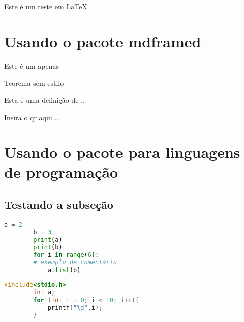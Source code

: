 \documentclass[11pt,a4paper]{article}
\begin{document}
	Este é um teste em \LaTeX

\section{Usando o pacote mdframed}
	\begin{mdframed}[style=exemplos]
		Este é um apenas 
	\end{mdframed}

\begin{mdframed}[style=teoremas]
	Teorema sem estilo
\end{mdframed}

\begin{mdframed}[style=definicao]
	Esta é uma definição de .. 	
\end{mdframed}

\begin{mdframed}[style=qrcodes]
	Insira o qr aqui .. 
\end{mdframed}
	
	\section{Usando o pacote para linguagens de programação }
	\subsection{Testando a subseção}
	
	\lstset{style=mypython}
	 \begin{lstlisting}[language=Python]
	 	a = 2
	 	b = 3
	 	print(a)
	 	print(b)
	 	for i in range(6):
	 	# exemplo de comentário
	 	    a.list(b)
	 \end{lstlisting}
 
	\lstset{style=myc}
	\begin{lstlisting}[language=C]
		#include<stdio.h>
		int a;
		for (int i = 0; i < 10; i++){
			printf("%d",i);
		}
	\end{lstlisting}
	
	
\end{document}
